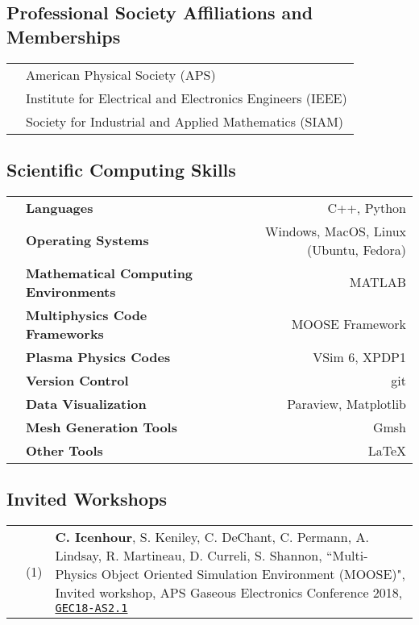 \documentclass{article}
\begin{document}
\subsection*{Professional Society Affiliations and Memberships}

\begin{tabularx}{\textwidth}{l l}
	\hspace{2em} & American Physical Society (APS) \\
				 & Institute for Electrical and Electronics Engineers (IEEE) \\
				 & Society for Industrial and Applied Mathematics (SIAM)
\end{tabularx}

\subsection*{Scientific Computing Skills}

	\begin{tabularx}{\textwidth}{l X r}
		\hspace {2em} & \textbf{Languages} & C++, Python \\
					        & \textbf{Operating Systems} & Windows, MacOS, Linux (Ubuntu, Fedora) \\
					        & \textbf{Mathematical Computing Environments} & MATLAB \\
					        & \textbf{Multiphysics Code Frameworks} & MOOSE Framework \\
					        & \textbf{Plasma Physics Codes} & VSim 6, XPDP1 \\
					        & \textbf{Version Control} & git \\
					        & \textbf{Data Visualization} & Paraview, Matplotlib \\
					        & \textbf{Mesh Generation Tools} & Gmsh \\
					        & \textbf{Other Tools} & \LaTeX
	\end{tabularx}

\subsection*{Invited Workshops}

	\begin{tabularx}{\textwidth}{l l X}
		\hspace{2em}
			& (1)  & \textbf{C. Icenhour}, S. Keniley, C. DeChant, C. Permann, A. Lindsay, R. Martineau, D. Curreli, S. Shannon, ``Multi-Physics Object Oriented Simulation Environment (MOOSE)", Invited workshop, APS Gaseous Electronics Conference 2018, \href{http://meetings.aps.org/link/BAPS.2018.GEC.AS2.1}{\texttt{GEC18-AS2.1}}
	\end{tabularx}
\end{document}
